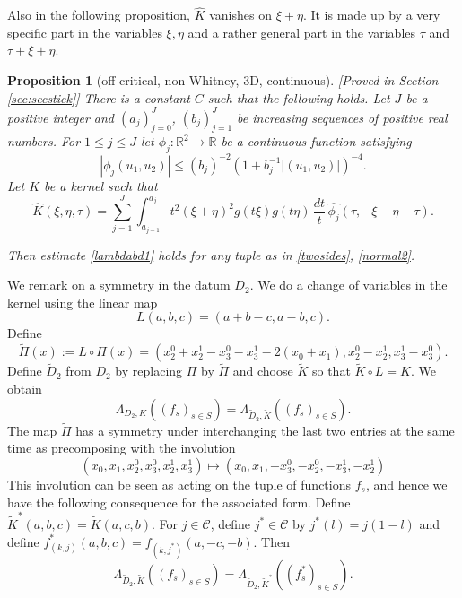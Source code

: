 \documentclass[12pt,reqno]{amsart}
\theoremstyle{plain}
\newtheorem{prop}[theorem]{Proposition}
\theoremstyle{definition}
\numberwithin{equation}{section}
\newcommand{\R}{{\mathbb R}}
\begin{document}
Also in the following proposition, $\widehat{K}$ vanishes on $\xi+\eta$.
It is made up by a very specific part in the variables $\xi,\eta$ and a 
rather general part in the variables $\tau$ and $\tau+\xi+\eta$.
 
\begin{prop}[off-critical, non-Whitney, 3D, continuous][Proved in Section \ref{sec:secstick}]
\label{secstickgauss}
 There is a constant $C$ such that the following holds. Let $J$ be a positive integer  and $(a_j)_{j=0}^J$, $(b_j)_{j=1}^J$  be increasing sequences of positive real numbers.    For $1\le j\le J$
 let $\phi_{j} :\R^2\to \R$ be a continuous function satisfying  
\begin{equation}\label{phistickgauss}
|\phi_{j}(u_1,u_2)| \leq (b_j)^{-2}(1+b_j^{-1}|(u_1, u_{2})|)^{-4} .  
\end{equation}
Let $K$ be a kernel such that
    \begin{equation}
        \label{ker2}
    \widehat{K}(\xi,\eta,\tau) =    \sum_{j=1}^J \int_{{a_{j-1}}}^{{a_{j}}}  t^2(\xi+\eta)^2 g(t\xi) g(t\eta)  \,\frac{dt}{t} \,
    \widehat{\phi_{j}}(\tau,-\xi-\eta-\tau).
    \end{equation}
    
    Then estimate \eqref{lambdabd1} holds for any tuple as in \eqref{twosides}, \eqref{normal2}.

\end{prop}






We remark on a symmetry in the datum $D_2$. We do a change of variables in the kernel using the linear map 
\[L(a,b,c)= (a+b-c, a-b,c).\] 
Define
\[\widetilde{\Pi}(x):=L\circ \Pi(x)=
(x_2^{0}+x_2^{1}-x_3^{0}-x_3^1-2(x_0+x_1), x_2^0-x_2^1, x_3^1-x_3^0).\]
Define $\widetilde{D}_2$ from $D_2$ by replacing $\Pi$ by $\widetilde{\Pi}$ and choose $\widetilde{K}$ so that $\widetilde{K}\circ L=K$. We obtain 
$$\Lambda_{D_2,K}((f_s)_{s\in S})=\Lambda_{\widetilde{D}_2,\widetilde{K}}(({f}_s)_{s\in S}).$$
The map $\widetilde{\Pi}$ has a symmetry under interchanging the 
last two entries at the same time as precomposing with the involution
$$(x_0,x_1,x_2^{0},x_3^{0},x_2^{1},x_3^{1})\mapsto (x_0,x_1,-x_3^{0},-x_2^{0},-x_3^{1},-x_2^{1})$$
This involution can be seen as acting on the tuple of functions $f_s$,
and hence we have the following consequence for the associated form.
Define $\widetilde{K}^*(a,b,c)=\widetilde{K}(a,c,b)$. For $j\in \mathcal{C}$, define $j^*\in \mathcal{C}$ by $j^*(l)=j(1-l)$ and define
$f^*_{(k,j)}(a,b,c)=f_{(k,j^*)}(a,-c,-b)$. Then
\begin{equation}\label{hiddensymm}
\Lambda_{\widetilde{D}_2,\widetilde{K}}(({f}_s)_{s\in S})
=\Lambda_{\widetilde{D}_2,\widetilde{K}^*}(({f}_s^*)_{s\in S}).
\end{equation}
\end{document}
